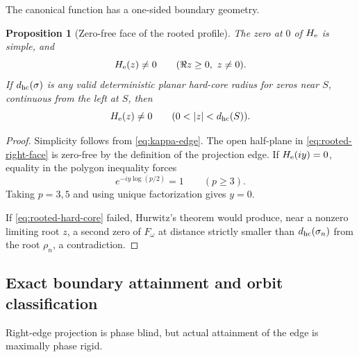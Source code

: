 \documentclass[11pt]{article}
\newtheorem{proposition}[theorem]{Proposition}
\theoremstyle{definition}
\theoremstyle{remark}
\begin{document}
The canonical function has a one-sided boundary geometry.

\begin{proposition}[Zero-free face of the rooted profile]
\label{prop:rooted-profile-zero-free-face}
The zero at $0$ of $H_{\rm e}$ is simple, and
\begin{equation}
 H_{\rm e}(z)\ne0
 \qquad(\Re z\ge0,\ z\ne0).
 \label{eq:rooted-right-face}
\end{equation}
If $d_{\rm hc}(\sigma)$ is any valid deterministic planar hard-core
radius for zeros near $S$, continuous from the left at $S$, then
\begin{equation}
 H_{\rm e}(z)\ne0
 \qquad(0<|z|<d_{\rm hc}(S)).
 \label{eq:rooted-hard-core}
\end{equation}
\end{proposition}

\begin{proof}
Simplicity follows from \eqref{eq:kappa-edge}.  The open half-plane in
\eqref{eq:rooted-right-face} is zero-free by the definition of the
projection edge.  If $H_{\rm e}(iy)=0$, equality in the polygon
inequality forces
\[
 e^{-iy\log(p/2)}=1\qquad(p\ge3).
\]
Taking $p=3,5$ and using unique factorization gives $y=0$.

If \eqref{eq:rooted-hard-core} failed, Hurwitz's theorem would produce,
near a nonzero limiting root $z$, a second zero of $F_\omega$ at
distance strictly smaller than $d_{\rm hc}(\sigma_n)$ from the root
$\rho_n$, a contradiction.
\end{proof}

\subsection{Exact boundary attainment and orbit classification}

Right-edge projection is phase blind, but actual attainment of the
edge is maximally phase rigid.
\end{document}
